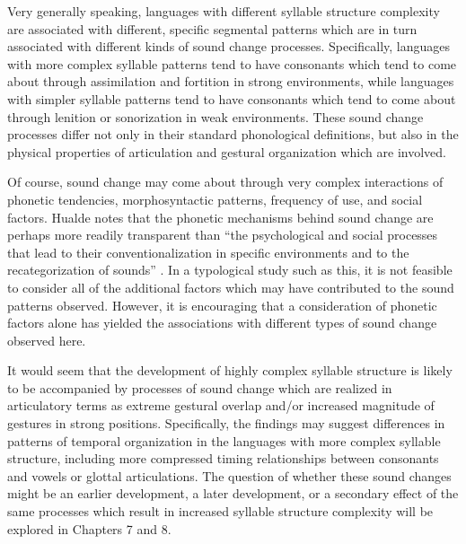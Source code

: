   Very generally speaking, languages with different syllable structure complexity are associated with different, specific segmental patterns which are in turn associated with different kinds of sound change processes. Specifically, languages with more complex syllable patterns tend to have consonants which tend to come about through assimilation and fortition in strong environments, while languages with simpler syllable patterns tend to have consonants which tend to come about through lenition or sonorization in weak environments. These sound change processes differ not only in their standard phonological definitions, but also in the physical properties of articulation and gestural organization which are involved.



  Of course, sound change may come about through very complex interactions of phonetic tendencies, morphosyntactic patterns, frequency of use, and social factors. Hualde notes that the phonetic mechanisms behind sound change are perhaps more readily transparent than “the psychological and social processes that lead to their conventionalization in specific environments and to the recategorization of sounds” \citep[2222]{Hualde2011}. In a typological study such as this, it is not feasible to consider all of the additional factors which may have contributed to the sound patterns observed. However, it is encouraging that a consideration of phonetic factors alone has yielded the associations with different types of sound change observed here.



  It would seem that the development of highly complex syllable structure is likely to be accompanied by processes of sound change which are realized in articulatory terms as extreme gestural overlap and/or increased magnitude of gestures in strong positions. Specifically, the findings may suggest differences in patterns of temporal organization in the languages with more complex syllable structure, including more compressed timing relationships between consonants and vowels or glottal articulations. The question of whether these sound changes might be an earlier development, a later development, or a secondary effect of the same processes which result in increased syllable structure complexity will be explored in Chapters 7 and 8.



